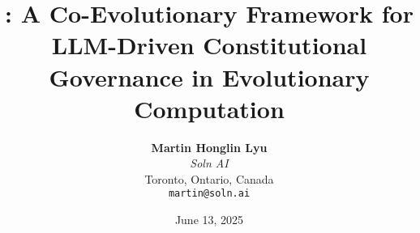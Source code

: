 




\title{\textbf{\acgsbold{}: A Co-Evolutionary Framework for LLM-Driven Constitutional Governance in Evolutionary Computation}}

\author{
    \textbf{Martin Honglin Lyu}\\
    \textit{Soln AI}\\
    Toronto, Ontario, Canada\\
    \texttt{martin@soln.ai}
}

\date{June 13, 2025}

\maketitle

